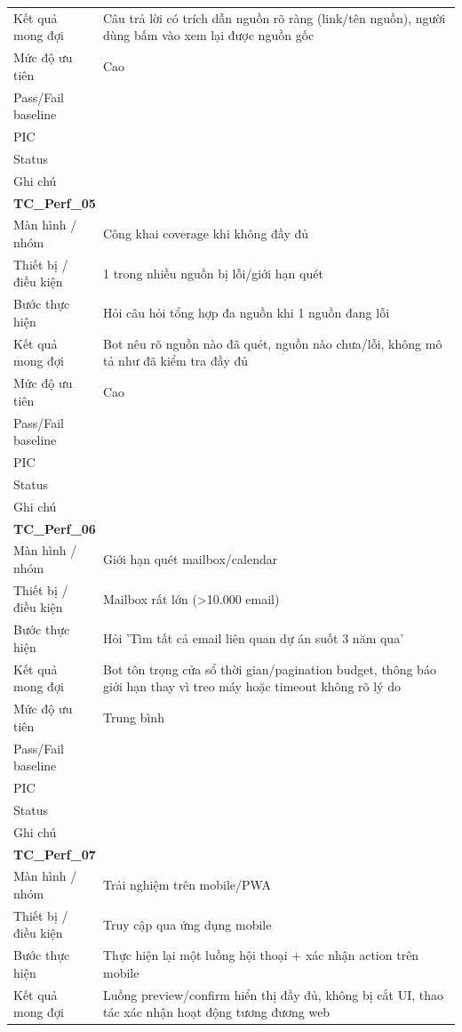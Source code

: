 \documentclass[12pt,a4paper]{article}
\begin{document}
\begin{longtable}{p{3.0cm}p{11.5cm}}
Kết quả mong đợi & Câu trả lời có trích dẫn nguồn rõ ràng (link/tên nguồn), người dùng bấm vào xem lại được nguồn gốc \\
Mức độ ưu tiên & Cao \\
Pass/Fail baseline &  \\
PIC &  \\
Status &  \\
Ghi chú &  \\
\midrule
\multicolumn{2}{l}{\textbf{TC\_Perf\_05}} \\
Màn hình / nhóm & Công khai coverage khi không đầy đủ \\
Thiết bị / điều kiện & 1 trong nhiều nguồn bị lỗi/giới hạn quét \\
Bước thực hiện & Hỏi câu hỏi tổng hợp đa nguồn khi 1 nguồn đang lỗi \\
Kết quả mong đợi & Bot nêu rõ nguồn nào đã quét, nguồn nào chưa/lỗi, không mô tả như đã kiểm tra đầy đủ \\
Mức độ ưu tiên & Cao \\
Pass/Fail baseline &  \\
PIC &  \\
Status &  \\
Ghi chú &  \\
\midrule
\multicolumn{2}{l}{\textbf{TC\_Perf\_06}} \\
Màn hình / nhóm & Giới hạn quét mailbox/calendar \\
Thiết bị / điều kiện & Mailbox rất lớn (>10.000 email) \\
Bước thực hiện & Hỏi 'Tìm tất cả email liên quan dự án suốt 3 năm qua' \\
Kết quả mong đợi & Bot tôn trọng cửa sổ thời gian/pagination budget, thông báo giới hạn thay vì treo máy hoặc timeout không rõ lý do \\
Mức độ ưu tiên & Trung bình \\
Pass/Fail baseline &  \\
PIC &  \\
Status &  \\
Ghi chú &  \\
\midrule
\multicolumn{2}{l}{\textbf{TC\_Perf\_07}} \\
Màn hình / nhóm & Trải nghiệm trên mobile/PWA \\
Thiết bị / điều kiện & Truy cập qua ứng dụng mobile \\
Bước thực hiện & Thực hiện lại một luồng hội thoại + xác nhận action trên mobile \\
Kết quả mong đợi & Luồng preview/confirm hiển thị đầy đủ, không bị cắt UI, thao tác xác nhận hoạt động tương đương web \\

\end{longtable}
\end{document}
